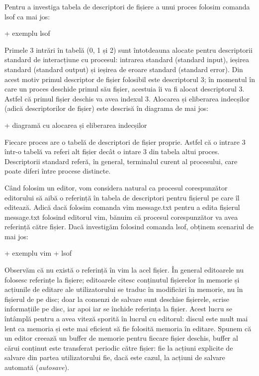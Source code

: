 Pentru a investiga tabela de descriptori de fișiere a unui proces folosim
comanda lsof ca mai jos:

+ exemplu lsof

Primele 3 intrări în tabelă (0, 1 și 2) sunt întotdeauna alocate pentru
descriptorii standard de interacțiune cu procesul: intrarea standard (standard
input), ieșirea standard (standard output) și ieșirea de eroare standard
(standard error). Din acest motiv primul descriptor de fișier folosibil este
descriptorul 3; în momentul în care un proces deschide primul său fișier,
acestuia îi va fi alocat descriptorul 3. Astfel că primul fișier deschis va avea
indexul 3. Alocarea și eliberarea indecșilor (adică descriptorilor de fișier)
este descrisă în diagrama de mai jos:

+     diagramă cu alocarea și eliberarea indecșilor

Fiecare proces are o tabelă de descriptori de fișier proprie. Astfel că o
intrare 3 într-o tabelă va referi alt fișier decât o intare 3 din tabela altui
proces. Descriptorii standard referă, în general, terminalul curent al
procesului, care poate diferi între procese distincte.

Când folosim un editor, vom considera natural ca procesul corespunzător
editorului să aibă o referință în tabela de descriptori pentru fișierul pe care
îl editează. Adică dacă folosim comanda vim message.txt pentru a edita fișierul
message.txt folosind editorul vim, bănuim că procesul corespunzător va avea
referință către fișier. Dacă investigăm folosind comanda lsof, obținem scenariul
de mai jos:

+ exemplu vim + lsof

Observăm că nu există o referință în vim la acel fișier. În general editoarele
nu folosesc referințe la fișiere; editoarele citesc conținutul fișierelor în
memorie și acțiunile de editare ale utilizatorului se traduc în modificări în
memorie, nu în fișierul de pe disc; doar la comenzi de salvare sunt deschise
fișierele, scrise informațiile pe disc, iar apoi iar se închide referința la
fișier. Acest lucru se întâmplă pentru a avea viteză sporită în lucrul cu
editorul: discul este mult mai lent ca memoria și este mai eficient să fie
folosită memoria în editare. Spunem că un editor creează un buffer de memorie
pentru fiecare fișier deschis, buffer al cărui conținut este transferat periodic
către fișier: fie la acțiuni explicite de salvare din partea utilizatorului fie,
dacă este cazul, la acțiuni de salvare automată (\textit{autosave}).

